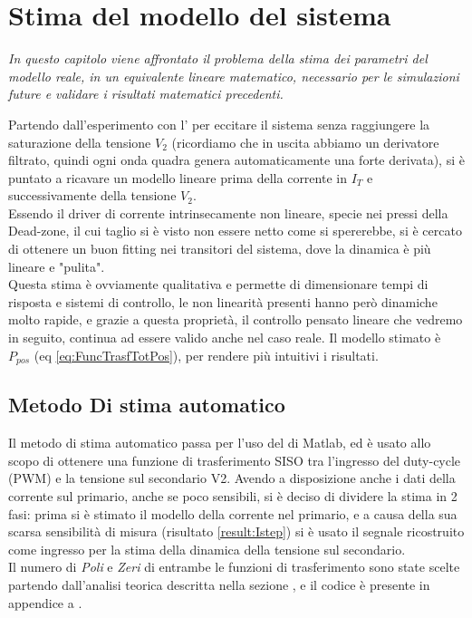 \chapter{Stima del modello del sistema}\label{cap:stimaModello}

\begin{minipage}{12cm}\textit{
		In questo capitolo viene affrontato il problema della stima dei parametri del modello reale, in un equivalente lineare matematico, necessario per le simulazioni future e validare i risultati matematici precedenti.}
\end{minipage}

\vspace*{1cm}
\noindent
Partendo dall'esperimento con l' per eccitare il sistema senza raggiungere la saturazione della tensione $ V_2 $ (ricordiamo che in uscita abbiamo un derivatore filtrato, quindi ogni onda quadra genera automaticamente una forte derivata), si è puntato a ricavare un modello lineare prima della corrente in $ I_T $ e successivamente della tensione $ V_2 $.\\
Essendo il driver di corrente intrinsecamente non lineare, specie nei pressi della Dead-zone, il cui taglio si è visto non essere netto come si spererebbe, si è cercato di ottenere un buon fitting nei transitori del sistema, dove la dinamica è più lineare e "pulita".\\
Questa stima è ovviamente qualitativa e permette di dimensionare tempi di risposta e sistemi di controllo, le non linearità presenti hanno però dinamiche molto rapide, e grazie a questa proprietà, il controllo pensato lineare che vedremo in seguito, continua ad essere valido anche nel caso reale.
Il modello stimato è $ P_{pos} $ (eq \ref{eq:FuncTrasfTotPos}), per rendere più intuitivi i risultati.

\newpage

\section{Metodo Di stima automatico}
Il metodo di stima automatico passa per l'uso del \cite*{IdentificationToolbox} di Matlab, ed è usato allo scopo di ottenere una funzione di trasferimento SISO tra l'ingresso del duty-cycle (PWM) e la tensione sul secondario V2. Avendo a disposizione anche i dati della corrente sul primario, anche se poco sensibili, si è deciso di dividere la stima in 2 fasi: prima si è stimato il modello della corrente nel primario, e a causa della sua scarsa sensibilità di misura (risultato \ref{result:Istep}) si è usato il segnale ricostruito come ingresso per la stima della dinamica della tensione sul secondario.\\
Il numero di \textit{Poli} e \textit{Zeri} di entrambe le funzioni di trasferimento sono state scelte partendo dall'analisi teorica descritta nella sezione , e il codice è presente in appendice a .

